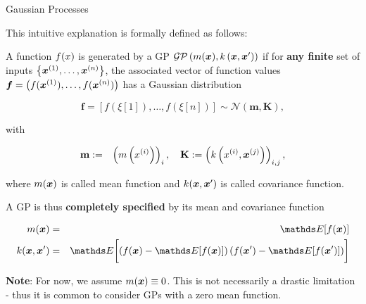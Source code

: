 \begin{vbframe}{Gaussian Processes}

This intuitive explanation is formally defined as follows: 

\lz 

A function $f(x)$ is generated by a GP $\mathcal{GP}\left(m(\bm{x}), k\left(\bm{x}, \bm{x}^{\prime} \right) \right)$ if for \textbf{any finite} set of inputs $\left\{\bm{x}^{(1)}, \dots, \bm{x}^{(n)}\right\}$, the associated vector of function values $\bm{f} = \left(f(\bm{x}^{(1)}), \dots, f(\bm{x}^{(n)})\right)$ has a Gaussian distribution

$$
\bm{f} = \left[f\left(\xi[1]\right),\dots, f\left(\xi[n]\right)\right] \sim \mathcal{N}\left(\bm{m}, \bm{K}\right),
$$

with 


\begin{eqnarray*}
\textbf{m} &:=& \left(m\left(x^{(i)}\right)\right)_{i}, \quad
\textbf{K} := \left(k\left(x^{(i)}, \bm{x}^{(j)}\right)\right)_{i,j}, 
\end{eqnarray*}
 
where $m(\bm{x})$ is called mean function and $k(\bm{x}, \bm{x}^\prime)$ is called covariance function. 


\framebreak 

\vspace*{0.5cm} 

A GP is thus \textbf{completely specified} by its mean and covariance function

\vspace*{-0.2cm}
\begin{eqnarray*}
m(\xv) &=& \E[f(\xv)] \\
k(\xv, \xv^\prime) &=& \E\biggl[\left( f(\xv) - \E[f(\xv)] \right) \left( f(\xv^\prime) - \E[f(\xv^\prime)] \right)\biggr]
\end{eqnarray*}

\vfill

\textbf{Note}: For now, we assume $m(\bm{x}) \equiv 0$. This is not necessarily a drastic limitation - thus it is common to consider GPs with a zero mean function. 








\end{vbframe}

